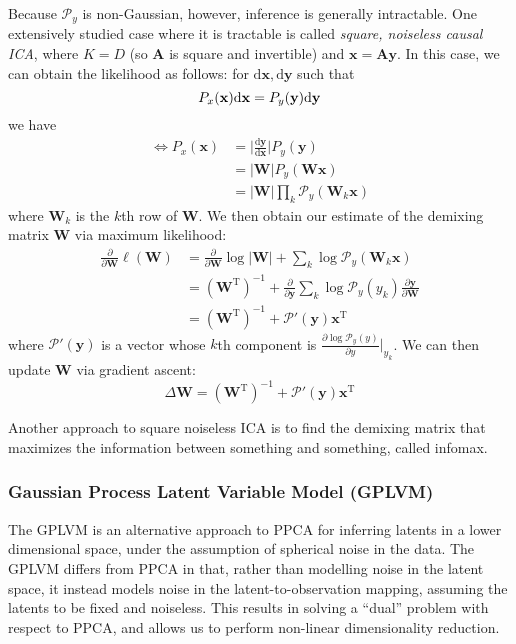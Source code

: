 \documentclass[a4paper]{article}
\begin{document}
Because $\mathcal{P}_y$ is non-Gaussian, however, inference is generally intractable. One extensively studied case where it is tractable is called \emph{square, noiseless causal ICA}, where $K=D$ (so $\mathbf{A}$ is square and invertible) and $\mathbf{x} = \mathbf{Ay}$. In this case, we can obtain the likelihood as follows: for $\textrm{d}\mathbf{x},\textrm{d}\mathbf{y}$ such that
\[ P_x(\mathbf{x})\textrm{d}\mathbf{x} = P_y(\mathbf{y})\textrm{d}\mathbf{y} \\ \]
we have
\begin{align*}
\Leftrightarrow P_x(\mathbf{x}) &= \Bigr| \frac{\textrm{d} \mathbf{y}}{\textrm{d} \mathbf{x}}\Bigr| P_y(\mathbf{y}) \\
&= |\mathbf{W}| P_y(\mathbf{Wx}) \\
&= |\mathbf{W}| \prod_k \mathcal{P}_y(\mathbf{W}_k \mathbf{x})
\end{align*}
where $\mathbf{W}_k$ is the $k$th row of $\mathbf{W}$. We then obtain our estimate of the demixing matrix $\mathbf{W}$ via maximum likelihood:
\begin{align*}
\frac{\partial}{\partial \mathbf{W}} \ell(\mathbf{W}) &= \frac{\partial}{\partial \mathbf{W}} \log|\mathbf{W}| + \sum_k \log \mathcal{P}_y(\mathbf{W}_k \mathbf{x}) \\
&= \left(\mathbf{W}^\textrm{T}\right)^{-1} + \frac{\partial}{\partial \mathbf{y}} \sum_k \log \mathcal{P}_y(y_k) \frac{\partial \mathbf{y}}{\partial \mathbf{W}} \\
&= \left(\mathbf{W}^\textrm{T}\right)^{-1} + \mathcal{P}'(\mathbf{y}) \mathbf{x}^\textrm{T}
\end{align*}
where $\mathcal{P}'(\mathbf{y})$ is a vector whose $k$th component is $\frac{\partial \log \mathcal{P}_y(y)}{\partial y} \Bigr|_{y_k}$. We can then update $\mathbf{W}$ via gradient ascent:
\[ \Delta \mathbf{W} = \left(\mathbf{W}^\textrm{T}\right)^{-1} + \mathcal{P}'(\mathbf{y}) \mathbf{x}^\textrm{T} \]

Another approach to square noiseless ICA is to find the demixing matrix that maximizes the information between something and something, called infomax. 

\subsubsection{Gaussian Process Latent Variable Model (GPLVM)}
The GPLVM is an alternative approach to PPCA for inferring latents in a lower dimensional space, under the assumption of spherical noise in the data. The GPLVM differs from PPCA in that, rather than modelling noise in the latent space, it instead models noise in the latent-to-observation mapping, assuming the latents to be fixed and noiseless. This results in solving a ``dual'' problem with respect to PPCA, and allows us to perform non-linear dimensionality reduction.
\end{document}
